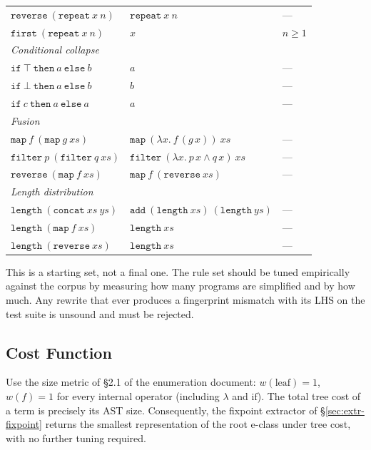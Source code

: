 \documentclass[11pt,a4paper]{article}
\begin{document}
\begin{center}
\begin{tabular}{lll}
$\mathtt{reverse}\ (\mathtt{repeat}\ x\ n)$ & $\mathtt{repeat}\ x\ n$ & --- \\
$\mathtt{first}\ (\mathtt{repeat}\ x\ n)$ & $x$ & $n \ge 1$ \\
\midrule
\multicolumn{3}{l}{\textit{Conditional collapse}} \\
$\mathtt{if}\ \top\ \mathtt{then}\ a\ \mathtt{else}\ b$ & $a$ & --- \\
$\mathtt{if}\ \bot\ \mathtt{then}\ a\ \mathtt{else}\ b$ & $b$ & --- \\
$\mathtt{if}\ c\ \mathtt{then}\ a\ \mathtt{else}\ a$ & $a$ & --- \\
\midrule
\multicolumn{3}{l}{\textit{Fusion}} \\
$\mathtt{map}\ f\ (\mathtt{map}\ g\ xs)$ & $\mathtt{map}\ (\lambda x.\ f\,(g\,x))\ xs$ & --- \\
$\mathtt{filter}\ p\ (\mathtt{filter}\ q\ xs)$ & $\mathtt{filter}\ (\lambda x.\ p\,x \wedge q\,x)\ xs$ & --- \\
$\mathtt{reverse}\ (\mathtt{map}\ f\ xs)$ & $\mathtt{map}\ f\ (\mathtt{reverse}\ xs)$ & --- \\
\midrule
\multicolumn{3}{l}{\textit{Length distribution}} \\
$\mathtt{length}\ (\mathtt{concat}\ xs\ ys)$ & $\mathtt{add}\ (\mathtt{length}\ xs)\ (\mathtt{length}\ ys)$ & --- \\
$\mathtt{length}\ (\mathtt{map}\ f\ xs)$ & $\mathtt{length}\ xs$ & --- \\
$\mathtt{length}\ (\mathtt{reverse}\ xs)$ & $\mathtt{length}\ xs$ & --- \\
\bottomrule
\end{tabular}
\end{center}

This is a starting set, not a final one. The rule set should be tuned empirically against the corpus by measuring how many programs are simplified and by how much. Any rewrite that ever produces a fingerprint mismatch with its LHS on the test suite is unsound and must be rejected.

\subsection{Cost Function}\label{sec:mlmp-cost}

Use the size metric of §2.1 of the enumeration document: $w(\text{leaf}) = 1$, $w(f) = 1$ for every internal operator (including $\lambda$ and $\mathrm{if}$). The total tree cost of a term is precisely its AST size. Consequently, the fixpoint extractor of §\ref{sec:extr-fixpoint} returns the smallest representation of the root e-class under tree cost, with no further tuning required.
\end{document}

